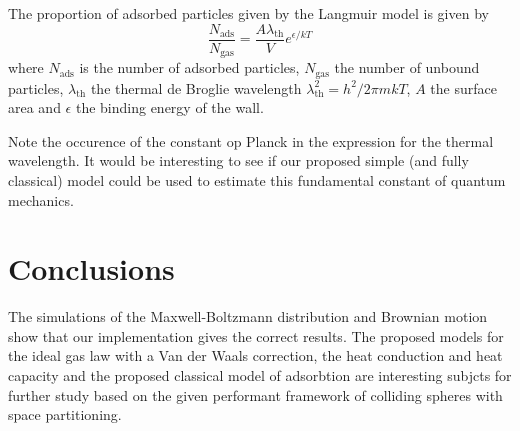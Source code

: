 The proportion of adsorbed particles given by the Langmuir model is given 
by\cite{adsorbtionModel}
$$
\frac{N_\mathrm{ads}}{N_\mathrm{gas}} =
\frac{A \lambda_\mathrm{th}}{V}e^{\epsilon/kT}
$$
where $N_\mathrm{ads}$ is the number of adsorbed particles, $N_\mathrm{gas} 
$ the number of unbound particles, $\lambda_{\textrm{th}}$ the thermal de 
Broglie wavelength $\lambda_{\mathrm{th}}^2 = h^2 / 2 \pi m k T$, $A$ the 
surface area and $\epsilon$ the binding energy of the wall.

Note the occurence of the constant op Planck in the expression for the 
thermal wavelength. It would be interesting to see if our proposed simple 
(and fully classical) model could be used to estimate this fundamental 
constant of quantum mechanics.


\section{Conclusions}
The simulations of the Maxwell-Boltzmann distribution and Brownian motion 
show that our implementation gives the correct results. The proposed models
for the ideal gas law with a Van der Waals correction, the heat conduction 
and heat capacity and the proposed classical model of adsorbtion are 
interesting subjcts for further study based on the given performant 
framework of colliding spheres with space partitioning.
